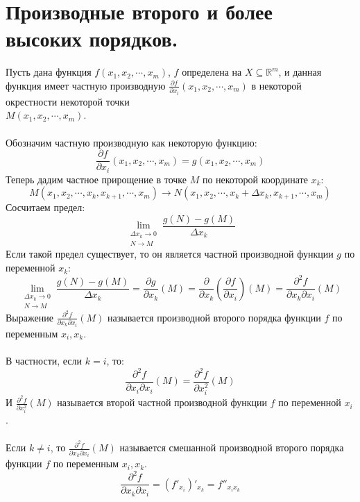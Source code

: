 \section{Производные второго и более высоких порядков.}
Пусть дана функция \(f(x_1,x_2,\cdots,x_m)\), \(f\) определена на \(X \subseteq \mathbb{R}^m\),
и данная функция имеет частную производную \(\frac{\partial f}{\partial x_i}(x_1,x_2,\cdots,x_m)\)
в некоторой окрестности некоторой точки\\ \(M(x_1,x_2,\cdots,x_m)\).\\\\
Обозначим частную производную как некоторую функцию:
\begin{equation*}
    \frac{\partial f}{\partial x_i}(x_1,x_2,\cdots,x_m) = g(x_1,x_2,\cdots,x_m)
\end{equation*}
Теперь дадим частное прирощение в точке \(M\) по некоторой координате \(x_k\):
\begin{equation*}
    M(x_1,x_2,\cdots,x_k, x_{k+1},\cdots,x_m) \to N(x_1,x_2,\cdots,x_k + \Delta x_k, x_{k+1},\cdots,x_m)
\end{equation*}
Сосчитаем предел:
\begin{equation*}
    \lim_{\substack{\Delta x_k \to 0 \\ N \to M}} \frac{g(N) - g(M)}{\Delta x_k}
\end{equation*}
Если такой предел существует, то он является частной производной функции \(g\) по переменной \(x_k\):
\begin{equation*}
    \lim_{\substack{\Delta x_k \to 0 \\ N \to M}} \frac{g(N) - g(M)}{\Delta x_k}
    = \frac{\partial g}{\partial x_k} (M)
    = \frac{\partial}{\partial x_k} \left( \frac{\partial f}{\partial x_i} \right) (M)
    = \frac{\partial^2 f}{\partial x_k \partial x_i} (M)
\end{equation*}
Выражение \(\frac{\partial^2 f}{\partial x_k \partial x_i} (M)\) называется производной второго порядка
функции \(f\) по переменным \(x_i, x_k\).\\\\
В частности, если \(k = i\), то:
\begin{equation*}
    \frac{\partial^2 f}{\partial x_i \partial x_i} (M) = \frac{\partial^2 f}{\partial x_i^2} (M)
\end{equation*}
И \(\frac{\partial^2 f}{\partial x_i^2} (M)\) называется второй частной производной функции \(f\)
по переменной \(x_i\).\\\\
Если \(k \neq i\), то \(\frac{\partial^2 f}{\partial x_k \partial x_i} (M)\) называется смешанной производной
второго порядка функции \(f\) по переменным \(x_i, x_k\).\\
\begin{equation*}
    \frac{\partial^2 f}{\partial x_k \partial x_i} = \left( f'_{x_i} \right)'_{x_k} = f''_{x_i x_k}
\end{equation*}